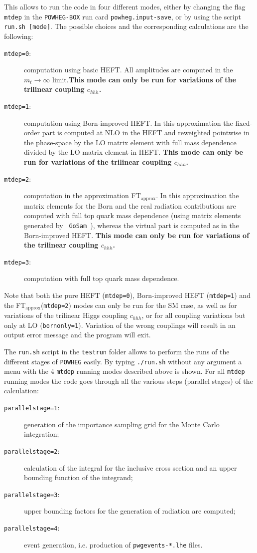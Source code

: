 \documentclass[paper]{JHEP3}
\newcommand\POWHEG{{\tt POWHEG}}
\newcommand\POWHEGBOX{{\tt POWHEG-BOX}}
\newcommand\ftapprox{FT$_{\mathrm{approx}}$\xspace}
\begin{document}
This allows to run the code in four different modes, either by
changing the flag {\tt mtdep} in the \POWHEGBOX{} run card {\tt powheg.input-save}, or by using the script {\tt run.sh [mode]}.
The possible choices and the corresponding calculations are the following:
\begin{description}
 \item[{\tt mtdep=0}:]{computation using basic HEFT. All amplitudes
   are computed in the $m_t\to\infty$ limit.\textbf{This mode can only be run for variations of 
   the trilinear coupling $c_{hhh}$.}}
 \item[{\tt mtdep=1}:]{computation using Born-improved HEFT. In this
   approximation the fixed-order part is computed at NLO in the HEFT
   and reweighted pointwise in the phase-space by the LO matrix
   element with full mass dependence divided by the LO matrix
   element in HEFT. \textbf{This mode can only be run for variations of 
   the trilinear coupling $c_{hhh}$.}}
 \item[{\tt mtdep=2}:]{computation in the approximation \ftapprox. In
   this approximation the matrix elements for the Born and the real
   radiation contributions are computed with full top quark mass dependence
   (using matrix elements generated by {\tt
     GoSam}~\cite{Cullen:2014yla}), whereas the virtual part is
   computed as in the Born-improved HEFT. \textbf{This mode can only be run for variations of 
   the trilinear coupling $c_{hhh}$.}}
 \item[{\tt mtdep=3}:]{computation with full top quark mass dependence.}
\end{description}

Note that both the pure HEFT ({\tt mtdep=0}), Born-improved HEFT ({\tt mtdep=1}) and the \ftapprox ({\tt mtdep=2}) modes can only be run for the
SM case, as well as for variations of the trilinear Higgs coupling $c_{hhh}$, or for all coupling variations but only at LO ({\tt bornonly=1}). Variation of the wrong couplings will result in an output error message and the program will exit.

The {\tt run.sh} script in the {\tt testrun} folder allows to perform 
the runs of the different stages of \POWHEG{} easily.
By typing {\tt ./run.sh} without any argument a menu with the
4 {\tt mtdep} running modes described above is shown. 
For all {\tt mtdep} running modes the code goes through all
the various steps (parallel stages) of the calculation: 
\begin{description}
 \item[{\tt parallelstage=1}:]
generation of the importance sampling grid for the Monte Carlo integration; 
 \item[{\tt parallelstage=2}:] calculation of the integral for the inclusive cross section and an upper bounding function of the integrand;
 \item[{\tt parallelstage=3}:] upper bounding factors for the generation of radiation are computed;
 \item[{\tt parallelstage=4}:] event generation, i.e. production of {\tt pwgevents-*.lhe} files.
\end{description}
\end{document}

